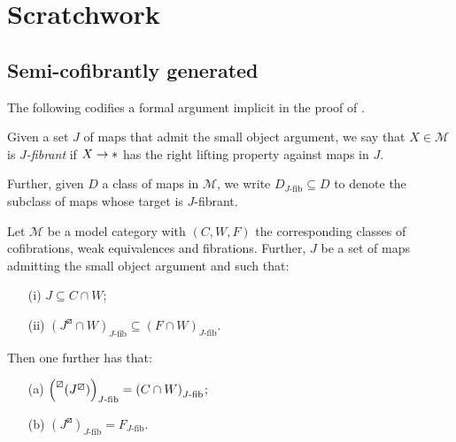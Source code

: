 \documentclass[a4paper,10pt
,draft
]{article}%
\renewcommand{\1}{\eta}%
\begin{document}

\newpage

\section{Scratchwork}




\subsection{Semi-cofibrantly generated}


The following codifies a formal argument implicit in the proof of \cite[Thm. 7.19]{CM13b}.

\begin{definition}
Given a set $J$ of maps that admit the small object argument, we say that $X \in \mathcal{M}$ is \textit{$J$-fibrant} if $X \to \**$ has the right lifting property against maps in $J$.

Further, given $D$ a class of maps in $\mathcal{M}$,
we write $D_{J\text{-fib}} \subseteq D$ to denote 
the subclass of maps whose target is $J$-fibrant.
\end{definition}

\begin{lemma}\label{SEMICOF LEM}
	Let $\mathcal{M}$ be a model category with $(C,W,F)$
	the corresponding classes of cofibrations, weak equivalences and fibrations. 
	Further, $J$ be a set of maps admitting the small object argument and such that:
\begin{itemize}
	\item[(i)] $J \subseteq C \cap W$;
	\item[(ii)] 
	$\left(J^{\boxslash} \cap W \right)_{J\text{-fib}}
	\subseteq \left( F \cap W \right)_{J\text{-fib}}$.
\end{itemize}
Then one further has that:
\begin{itemize}
	\item[(a)]
	$\left(\prescript{\boxslash}{}{\left(J^{\boxslash}\right)}\right)_{J\text{-fib}}
	= 
	\left( C \cap W \right)_{J\text{-fib}}$;
	\item[(b)]
	$\left(J^{\boxslash} \right)_{J\text{-fib}}
	= F_{J\text{-fib}}$.
\end{itemize}
\end{lemma}
\end{document}
